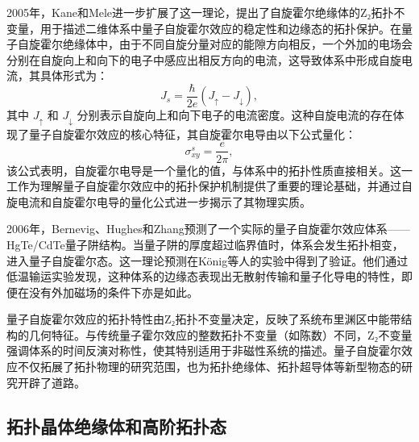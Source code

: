 2005年，Kane和Mele进一步扩展了这一理论\cite{e2,e3}，提出了自旋霍尔绝缘体的Z₂拓扑不变量，用于描述二维体系中量子自旋霍尔效应的稳定性和边缘态的拓扑保护。在量子自旋霍尔绝缘体中，由于不同自旋分量对应的能隙方向相反，一个外加的电场会分别在自旋向上和向下的电子中感应出相反方向的电流，这导致体系中形成自旋电流，其具体形式为：
\begin{equation} \label{eq1-6}
    J_s = \frac{\hbar}{2e}(J_\uparrow - J_\downarrow),
\end{equation}
其中 \(J_\uparrow\) 和 \(J_\downarrow\) 分别表示自旋向上和向下电子的电流密度。这种自旋电流的存在体现了量子自旋霍尔效应的核心特征，其自旋霍尔电导由以下公式量化：
\begin{equation} \label{eq1-7}
    \sigma_{xy}^s = \frac{e}{2\pi},
\end{equation}
该公式表明，自旋霍尔电导是一个量化的值，与体系中的拓扑性质直接相关。这一工作为理解量子自旋霍尔效应中的拓扑保护机制提供了重要的理论基础，并通过自旋电流和自旋霍尔电导的量化公式进一步揭示了其物理实质。

2006年，Bernevig、Hughes和Zhang预测了一个实际的量子自旋霍尔效应体系——HgTe/CdTe量子阱结构\cite{e4}。当量子阱的厚度超过临界值时，体系会发生拓扑相变，进入量子自旋霍尔态。这一理论预测在König等人的实验中得到了验证\cite{e5}。他们通过低温输运实验发现，这种体系的边缘态表现出无散射传输和量子化导电的特性，即便在没有外加磁场的条件下亦是如此。

量子自旋霍尔效应的拓扑特性由Z₂拓扑不变量决定，反映了系统布里渊区中能带结构的几何特征。与传统量子霍尔效应的整数拓扑不变量（如陈数）不同，Z₂不变量强调体系的时间反演对称性，使其特别适用于非磁性系统的描述。量子自旋霍尔效应不仅拓展了拓扑物理的研究范围，也为拓扑绝缘体、拓扑超导体等新型物态的研究开辟了道路。


\subsection{拓扑晶体绝缘体和高阶拓扑态}

